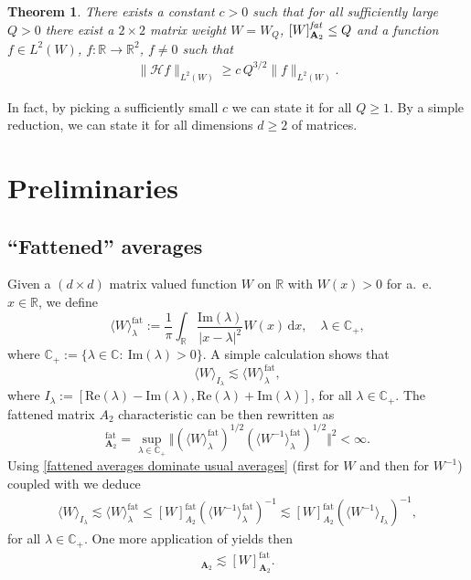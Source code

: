 \documentclass{amsart}
\newcommand{\C}{\mathbb{C}}
\newcommand{\R}{\mathbb{R}}
\newtheorem{thm}{Theorem}[section]
\theoremstyle{definition}
\theoremstyle{remark}
\begin{document}
\begin{thm}\label{MainTheorem1}
There exists a constant $c>0$ such that for all sufficiently large 
$Q>0$ there exist a $2\times 2$ matrix weight $W=W_{Q}$, 
$[W]_{\mathbf{A}_2}^{\emph{fat}}\leq Q$ and 
a function $f\in L^2(W)$, $f:\R\to \R^2$, $f\ne 0$ such that
\begin{align*}
\| \mathcal{H} f \|_{L^2(W)} \geq c\,Q^{3/2} \|f\|_{L^2(W)}. 
\end{align*}
\end{thm}

In fact, by picking a sufficiently small $c$ we can  state it for all $Q\ge 1$. By a simple 
reduction, we can state it for all dimensions $d\ge 2 $ of matrices.




\section{Preliminaries}

\subsection{``Fattened'' averages}
	
	Given a $(d\times d)$ matrix valued function $W$ on $\R$ with $W(x)>0$ for a.~e.~$x\in\R$, we define
	\begin{equation*}
		\langle W \rangle^{\text{fat}}_{\lambda}:=\frac{1}{\pi}\int_{\R}\frac{\mathrm{Im}(\lambda)}{|x-\lambda|^2}W(x)\,\mathrm{d}x,\quad\lambda\in\C_{+},
	\end{equation*}
    where $\C_{+} := \{\lambda\in\C:~\mathrm{Im}(\lambda)>0\}$. A simple calculation shows that
	\begin{equation}
		\label{fattened averages dominate usual averages}
		\langle W \rangle_{I_{\lambda}}
		\lesssim\langle W \rangle^{\text{fat}}_{\lambda},
	\end{equation}
	where $I_{\lambda}:=[\text{Re}(\lambda)-\text{Im}(\lambda),\text{Re}(\lambda)+\text{Im}(\lambda)]$, for all $\lambda\in\C_{+}$. The fattened matrix $A_2$ characteristic can be then rewritten as
	\begin{equation*}
		[W]^{\text{fat}}_{\mathbf{A}_2}=\sup_{\lambda\in\C_{+}}\Vert(\langle W \rangle^{\text{fat}}_{\lambda})^{1/2}(\langle W^{-1} \rangle^{\text{fat}}_{\lambda})^{1/2}\Vert^2<\infty.
	\end{equation*}
	Using \eqref{fattened averages dominate usual averages} (first for $W$ and then for $W^{-1}$) coupled with \cite[Lemma 3.1]{DoPeTrVo} we deduce
	\begin{align*}
		\langle W \rangle_{I_{\lambda}}
		\lesssim\langle W \rangle^{\text{fat}}_{\lambda}\leq[W]_{A_2}^{\mathrm{fat}}(\langle W^{-1}\rangle^{\text{fat}}_{\lambda})^{-1}\lesssim[W]_{A_2}^{\mathrm{fat}}(\langle W^{-1}\rangle_{I_{\lambda}})^{-1},
	\end{align*}
	for all $\lambda\in\C_{+}$. One more application of \cite[Lemma 3.1]{DoPeTrVo} yields then
	\begin{align*}
		[W]_{\mathbf{A}_2}\lesssim[W]^{\text{fat}}_{\mathbf{A}_2}.
	\end{align*}
\end{document}

